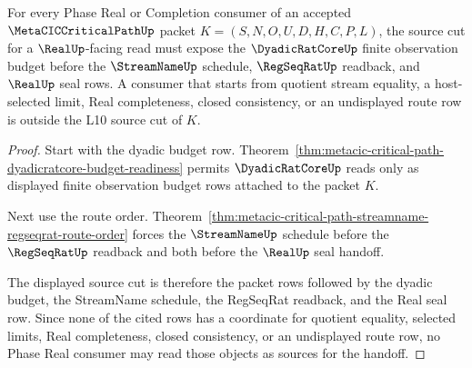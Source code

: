 \begin{theorem}
\label{thm:metacic-critical-path-l10-source-cut}
For every Phase Real or Completion consumer of an accepted $\MetaCICCriticalPathUp$ packet $K=(S,N,O,U,D,H,C,P,L)$, the source cut for a $\RealUp$-facing read must expose the $\DyadicRatCoreUp$ finite observation budget before the $\StreamNameUp$ schedule, $\RegSeqRatUp$ readback, and $\RealUp$ seal rows. A consumer that starts from quotient stream equality, a host-selected limit, Real completeness, closed consistency, or an undisplayed route row is outside the L10 source cut of $K$.
\end{theorem}
\begin{proof}
Start with the dyadic budget row. Theorem~\ref{thm:metacic-critical-path-dyadicratcore-budget-readiness} permits $\DyadicRatCoreUp$ reads only as displayed finite observation budget rows attached to the packet $K$.

Next use the route order. Theorem~\ref{thm:metacic-critical-path-streamname-regseqrat-route-order} forces the $\StreamNameUp$ schedule before the $\RegSeqRatUp$ readback and both before the $\RealUp$ seal handoff.

The displayed source cut is therefore the packet rows followed by the dyadic budget, the StreamName schedule, the RegSeqRat readback, and the Real seal row. Since none of the cited rows has a coordinate for quotient equality, selected limits, Real completeness, closed consistency, or an undisplayed route row, no Phase Real consumer may read those objects as sources for the handoff.
\end{proof}


